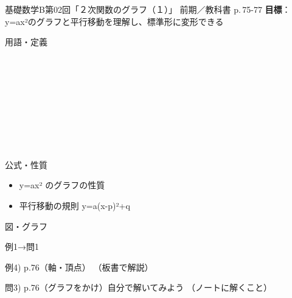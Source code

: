 \documentclass[aspectratio=43,professionalfonts,handout]{beamer}
\newcommand{\LectureNum}{02}
\newcommand{\LectureTitle}{２次関数のグラフ（１）}
\newcommand{\TextPages}{p.\,75-77}
\newcommand{\CourseName}{基礎数学B}
\renewcommand{\TermName}{前期}
\begin{document}
\begin{frame}{\CourseName\quad 第\LectureNum 回「\LectureTitle 」}
  {\small \TermName\quad \TeacherName\quad ／\quad 教科書 \TextPages\quad
  \textbf{目標}：y=ax²のグラフと平行移動を理解し、標準形に変形できる}

  \begin{block}{用語・定義}
  \begin{description}[labelwidth=5.5em]
    \item[\kw{2次関数}] ~
    \item[\kw{放物線}] ~
    \item[\kw{軸}] ~
    \item[\kw{頂点}] ~
    \item[\kw{標準形}] ~
  \end{description}
  \end{block}
\end{frame}

\begin{frame}{公式・性質}
  \begin{block}{}
  \begin{itemize}
    \item y=ax² のグラフの性質
    \item 平行移動の規則 y=a(x-p)²+q
  \end{itemize}
  \end{block}
\end{frame}

\begin{frame}{図・グラフ}
  \centering
\end{frame}

\begin{frame}{例1→問1}
  \begin{exampleblock}{例4) p.76（軸・頂点）}
    （板書で解説）
  \end{exampleblock}

  \vfill

  \begin{block}{問3) p.76（グラフをかけ）\quad 自分で解いてみよう}
    （ノートに解くこと）
  \end{block}
\end{frame}
\end{document}
